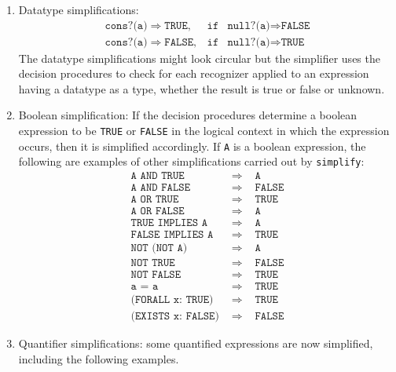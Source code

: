 \documentclass[12pt,twoside]{book}
\makeatletter
\newcommand{\indtt}[1]{\texttt{#1}\index{#1@{\texttt{#1}}}}  %
\makeatother
\begin{document}
\begin{description}
\begin{enumerate}
\item Datatype simplifications:
\begin{eqnarray*}
 \texttt{cons?(a)} \Longrightarrow \texttt{TRUE}, & \texttt{if} &
   \texttt{null?(a)} \Longrightarrow \texttt{FALSE}\\
 \texttt{cons?(a)} \Longrightarrow \texttt{FALSE}, &\texttt{if}&
   \texttt{null?(a)} \Longrightarrow \texttt{TRUE}
\end{eqnarray*}
The datatype simplifications might look circular but the simplifier
uses the decision procedures to check for each recognizer applied to an
expression having a datatype 
as a type, whether the result is true or false or unknown.

\item Boolean simplification:  If the decision procedures determine a
boolean expression to be \texttt{TRUE} or \texttt{FALSE} in the logical context
in which the expression occurs, then it is simplified accordingly.  
If \texttt{A} is a boolean expression, the
following are examples of other simplifications carried out by \indtt{simplify}:
\begin{eqnarray*}
  \texttt{A\ AND\ TRUE\ } & \Longrightarrow & \texttt{\ A}\\ 
  \texttt{A\ AND\ FALSE\ } & \Longrightarrow & \texttt{\ FALSE}\\
  \texttt{A\ OR\ TRUE\ } & \Longrightarrow & \texttt{\ TRUE}\\
  \texttt{A\ OR\ FALSE\ } & \Longrightarrow & \texttt{\ A}\\
  \texttt{TRUE\ IMPLIES\ A\ } & \Longrightarrow & \texttt{\ A}\\
  \texttt{FALSE\ IMPLIES\ A\ } & \Longrightarrow & \texttt{\ TRUE}\\
  \texttt{NOT\ (NOT\ A)\ } & \Longrightarrow & \texttt{\ A}\\
  \texttt{NOT\ TRUE\ } & \Longrightarrow & \texttt{\ FALSE}\\
  \texttt{NOT\ FALSE\ } & \Longrightarrow & \texttt{\ TRUE}\\
  \texttt{a = a\ } & \Longrightarrow & \texttt{\ TRUE}\\
  \texttt{(FORALL\ x:\ TRUE)\ } & \Longrightarrow & \texttt{\ TRUE}\\
  \texttt{(EXISTS\ x:\ FALSE)\ } & \Longrightarrow & \texttt{\ FALSE}
\end{eqnarray*}
\item Quantifier simplifications: some quantified expressions are now
simplified, including the following examples.


\end{enumerate}
\end{description}
\end{document}
